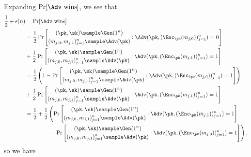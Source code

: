 \begin{answer}[ii]
    Expanding $\Pr[\Adv \textrm{ wins}]$, we see that
    \begin{align*}
        \frac{1}{2}+\epsilon(n)&= \Pr[\Adv \textrm{ wins}] \\
        &= \frac{1}{2}\Pr\left[\begin{gathered}
            (\pk, \sk)\sample\Gen(1^n)\\
            (m_{j,0},m_{j,1})_{j=1}^n \sample \Adv(\pk)
        \end{gathered}: \Adv(\pk,  (\Enc_\pk(m_{j,0}))_{j=1}^n)=0 \right]\\
        &+ \frac{1}{2}\Pr\left[\begin{gathered}
            (\pk, \sk)\sample\Gen(1^n)\\
            (m_{j,0},m_{j,1})_{j=1}^n \sample \Adv(\pk)
        \end{gathered}: \Adv(\pk,  (\Enc_\pk(m_{j,1}))_{j=1}^n)=1 \right]\\
        &= \frac{1}{2}\left(1-\Pr\left[\begin{gathered}
            (\pk, \sk)\sample\Gen(1^n)\\
            (m_{j,0},m_{j,1})_{j=1}^n \sample \Adv(\pk)
        \end{gathered}: \Adv(\pk,  (\Enc_\pk(m_{j,0}))_{j=1}^n)=1 \right]\right)\\
        &+ \frac{1}{2}\Pr\left[\begin{gathered}
            (\pk, \sk)\sample\Gen(1^n)\\
            (m_{j,0},m_{j,1})_{j=1}^n \sample \Adv(\pk)
        \end{gathered}: \Adv(\pk,  (\Enc_\pk(m_{j,1}))_{j=1}^n)=1 \right]\\
        &= \frac{1}{2}+ \frac{1}{2}\left(
        \Pr\left[\begin{gathered}
            (\pk, \sk)\sample\Gen(1^n)\\
            (m_{j,0},m_{j,1})_{j=1}^n \sample \Adv(\pk)
        \end{gathered}: \Adv(\pk,  (\Enc_\pk(m_{j,1}))_{j=1}^n)=1 \right] \right.\\
        &\left. \qquad\qquad\;  -\Pr\left[\begin{gathered}
            (\pk, \sk)\sample\Gen(1^n)\\
            (m_{j,0},m_{j,1})_{j=1}^n \sample \Adv(\pk)
        \end{gathered}: \Adv(\pk,  (\Enc_\pk(m_{j,0}))_{j=1}^n)=1 \right]
        \right),
    \end{align*}
    so we have 

\end{answer}
